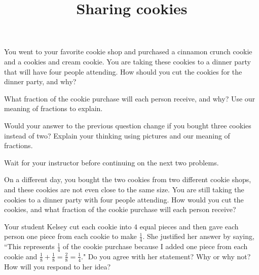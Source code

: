 \documentclass[nooutcomes,noauthor,handout]{ximera}
\title{Sharing cookies}
\begin{document}
\begin{abstract}\end{abstract}
\maketitle

\begin{problem}
You went to your favorite cookie shop and purchased a cinnamon crunch cookie and a cookies and cream cookie. You are taking these cookies to a dinner party that will have four people attending. How should you cut the cookies for the dinner party, and why?
\end{problem}


\begin{problem}
What fraction of the cookie purchase will each person receive, and why? Use our meaning of fractions to explain.
\end{problem}


\begin{problem}
Would your answer to the previous question change if you bought three cookies instead of two? Explain your thinking using pictures and our meaning of fractions.
\end{problem}

\vfill
Wait for your instructor before continuing on the next two problems.
\newpage

\begin{problem}
On a different day, you bought the two cookies from two different cookie shops, and these cookies are not even close to the same size. You are still taking the cookies to a dinner party with four people attending. How would you cut the cookies, and what fraction of the cookie purchase will each person receive?
\end{problem}


\begin{problem}
  Your student Kelsey cut each cookie into $4$ equal pieces and then gave each person one piece from each cookie to make $\frac{1}{4}$.  She justified her answer by saying, ``This represents $\frac{1}{4}$ of the cookie purchase because I added one piece from each cookie and   $\frac{1}{8}+\frac{1}{8}= \frac{2}{8} =\frac{1}{4}$."  Do you agree with her statement?  Why or why not?  How will you respond to her idea?
  
  
  
  
\end{problem}
\newpage
\end{document}
